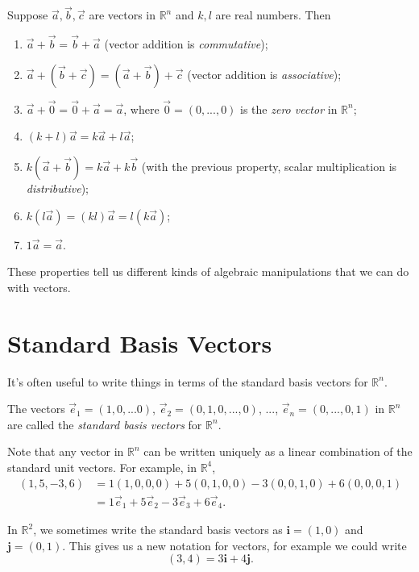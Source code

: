 \documentclass{ximera}
\begin{document}
\begin{proposition}
Suppose $\vec{a},\vec{b},\vec{c}$ are vectors in $\mathbb{R}^n$ and $k,l$ are real numbers. Then 
\begin{enumerate}
\item $\vec{a}+\vec{b} = \vec{b}+\vec{a}$ (vector addition is \emph{commutative});
\item $\vec{a}+(\vec{b}+\vec{c}) = (\vec{a}+\vec{b})+\vec{c}$ (vector addition is \emph{associative});
\item $\vec{a}+\vec{0} = \vec{0}+\vec{a} = \vec{a}$, where $\vec{0} = (0,...,0)$ is the \emph{zero vector} in $\mathbb{R}^n$;
\item $(k+l)\vec{a} = k\vec{a}+l\vec{a}$;
\item $k(\vec{a}+\vec{b}) = k\vec{a}+k\vec{b}$ (with the previous property, scalar multiplication is \emph{distributive});
\item $k(l\vec{a})=(kl)\vec{a} = l(k\vec{a})$;
\item $1\vec{a} = \vec{a}$.
\end{enumerate}
\end{proposition}

These properties tell us different kinds of algebraic manipulations that we can do with vectors.

\section*{Standard Basis Vectors}

It's often useful to write things in terms of the standard basis vectors for $\mathbb{R}^n$.

\begin{definition}
The vectors $\vec{e}_1 = (1,0,...0)$, $\vec{e}_2 = (0,1,0,...,0)$, ..., $\vec{e}_n = (0,...,0,1)$ in $\mathbb{R}^n$ are called the \emph{standard basis vectors} for $\mathbb{R}^n$.
\end{definition}

Note that any vector in $\mathbb{R}^n$ can be written uniquely as a linear combination of the standard unit vectors. For example, in $\mathbb{R}^4$,
\begin{align*}
(1,5,-3,6) &= 1(1,0,0,0)+5(0,1,0,0)-3(0,0,1,0)+6(0,0,0,1)\\
&= 1\vec{e}_1+5\vec{e}_2-3\vec{e}_3+6\vec{e}_4.
\end{align*}

In $\mathbb{R}^2$, we sometimes write the standard basis vectors as $\mathbf{i} = (1,0)$ and $\mathbf{j} = (0,1)$. This gives us a new notation for vectors, for example we could write
\[
(3,4) = 3\mathbf{i}+4\mathbf{j}.
\]
\end{document}
